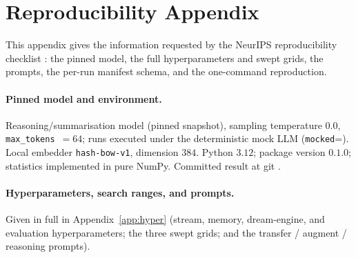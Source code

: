 \section{Reproducibility Appendix}\label{app:repro}

This appendix gives the information requested by the NeurIPS reproducibility
checklist \citep{pineau2021reproducibility}: the pinned model, the full
hyperparameters and swept grids, the prompts, the per-run manifest schema, and
the one-command reproduction.

\paragraph{Pinned model and environment.} Reasoning/summarisation model
\texttt{\SWmodelID} (pinned snapshot), sampling temperature $0.0$,
\texttt{max\_tokens}~$=64$; runs executed under the deterministic mock LLM
(\texttt{mocked}=\SWmodelMocked). Local embedder \texttt{hash-bow-v1}, dimension
$384$. Python $3.12$; package version $0.1.0$; statistics implemented in pure
NumPy. Committed result at git \texttt{\SWgitCommit}.

\paragraph{Hyperparameters, search ranges, and prompts.} Given in full in
Appendix~\ref{app:hyper} (stream, memory, dream-engine, and evaluation
hyperparameters; the three swept grids; and the transfer / augment / reasoning
prompts).

